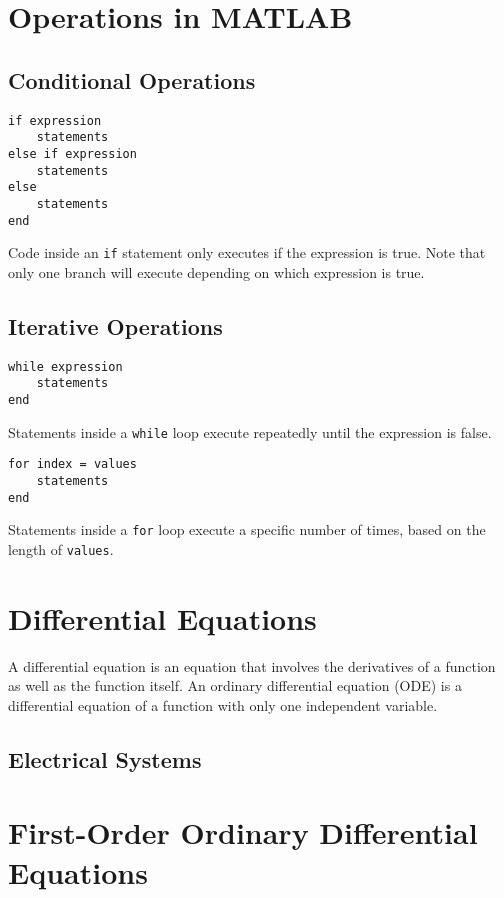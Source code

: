 \documentclass{article}
\begin{document}
\section{Operations in MATLAB}
\begin{multicols}{2}
    \subsection{Conditional Operations}
    \begin{lstlisting}
if expression
    statements
else if expression
    statements
else
    statements
end
    \end{lstlisting}
    Code inside an \lstinline{if} statement only executes if the expression is true. Note that only one branch will execute depending on which expression is true.
    \subsection{Iterative Operations}
    \begin{lstlisting}
while expression
    statements
end
    \end{lstlisting}
    Statements inside a \lstinline{while} loop \linebreak execute repeatedly until the expression is false.
    \begin{lstlisting}
for index = values
    statements
end
    \end{lstlisting}
    Statements inside a \lstinline{for} loop execute a specific number of times, based on the length of \lstinline{values}.
\end{multicols}
\section{Differential Equations}
\begin{definition}
    A differential equation is an equation that involves the derivatives of a function as well as the function itself.
    An ordinary differential equation (ODE) is a differential equation of a function with only one independent variable.
\end{definition}
\subsection{Electrical Systems}

\section{First-Order Ordinary Differential Equations}
\end{document}

